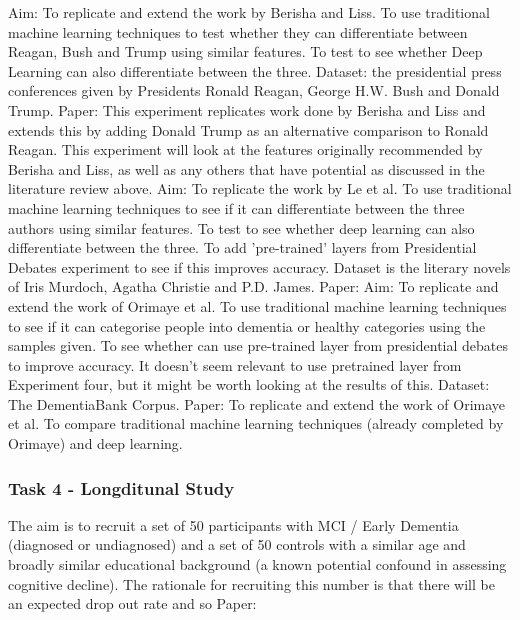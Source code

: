 \documentclass[12pt, twoside, a4paper]{article}
\begin{document}
Aim: To replicate and extend the work by Berisha and Liss. To use traditional machine learning techniques to test whether they can differentiate between Reagan, Bush and Trump using similar features. To test to see whether Deep Learning can also differentiate between the three. \newline
Dataset: the presidential press conferences given by Presidents Ronald Reagan, George H.W. Bush and Donald Trump. \newline
Paper: This experiment replicates work done by Berisha and Liss and extends this by adding Donald Trump as an alternative comparison to Ronald Reagan. This experiment will look at the features originally recommended by Berisha and Liss, as well as any others that have potential as discussed in the literature review above. \newline
Aim: To replicate the work by Le et al. To use traditional machine learning techniques to see if it can differentiate between the three authors using similar features. To test to see whether deep learning can also differentiate between the three. To add 'pre-trained' layers from Presidential Debates experiment to see if this improves accuracy. \newline
Dataset is the literary novels of Iris Murdoch, Agatha Christie and P.D. James. \newline
Paper:
Aim: To replicate and extend the work of Orimaye et al. To use traditional machine learning techniques to see if it can categorise people into dementia or healthy categories using the samples given. To see whether can use pre-trained layer from presidential debates to improve accuracy. It doesn't seem relevant to use pretrained layer from Experiment four, but it might be worth looking at the results of this. \newline
Dataset: The DementiaBank Corpus. \newline
Paper: To replicate and extend the work of Orimaye et al. To compare traditional machine learning techniques (already completed by Orimaye) and deep learning. \newline

\subsubsection{Task 4 - Longditunal Study}

The aim is to recruit a set of 50 participants with MCI / Early Dementia (diagnosed or undiagnosed) and a set of 50 controls with a similar age and broadly similar educational background (a known potential confound in assessing cognitive decline). The rationale for recruiting this number is that there will be an expected drop out rate and so
Paper:
\end{document}
